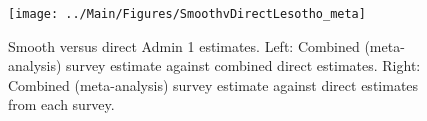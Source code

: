 \documentclass[12pt]{article}\usepackage[]{graphicx}\usepackage[]{color}
\newenvironment{knitrout}{}{} %
\begin{document}



\begin{knitrout}
\color{fgcolor}\begin{figure}[bht]

{\centering \texttt{[image: ../Main/Figures/SmoothvDirectLesotho\_meta]} 

}

\caption[Smooth versus direct Admin 1 estimates]{Smooth versus direct Admin 1 estimates. Left: Combined (meta-analysis) survey estimate against combined direct estimates. Right: Combined (meta-analysis) survey estimate against direct estimates from each survey.}\label{fig:unnamed-chunk-173}
\end{figure}


\end{knitrout}
\end{document}
